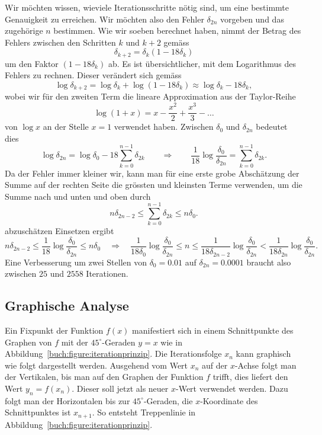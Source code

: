 \begin{beispiel}
Wir möchten wissen, wieviele Iterationsschritte nötig sind, um eine
bestimmte Genauigkeit zu erreichen.
Wir möchten also den Fehler $\delta_{2n}$ vorgeben und das zugehörige
$n$ bestimmen.
Wie wir soeben berechnet haben, nimmt der Betrag des Fehlers zwischen
den Schritten $k$ und $k+2$ gemäss
\[
\delta_{k+2} = \delta_{k} (1-18\delta_k)
\]
um den Faktor $(1-18\delta_k)$ ab.
Es ist übersichtlicher, mit dem Logarithmus des Fehlers zu rechnen.
Dieser verändert sich gemäss
\[
\log \delta_{k+2}
=
\log \delta_{k} + \log(1-18\delta_k)
\approx
\log\delta_k - 18\delta_k,
\]
wobei wir für den zweiten Term die lineare Approximation aus der
Taylor-Reihe
\[
\log (1+x) = x - \frac{x^2}2 + \frac{x^3}3 -\dots
\]
von 
$\log x $ an der Stelle $x=1$ verwendet haben.
Zwischen $\delta_0$ und $\delta_{2n}$ bedeutet dies
\[
\log\delta_{2n}
=
\log\delta_0
-18
\sum_{k=0}^{n-1} \delta_{2k}
\qquad\Rightarrow\qquad
\frac1{18}
\log\frac{\delta_0}{\delta_{2n}}
=
\sum_{k=0}^{n-1}\delta_{2k}.
\]
Da der Fehler immer kleiner wir, kann man für eine erste grobe Abschätzung
der Summe auf der rechten Seite die grössten und kleinsten Terme
verwenden, um die Summe nach und unten und oben durch
\[
n\delta_{2n-2}
\le
\sum_{k=0}^{n-1}\delta_{2k}
\le
n\delta_0.
\]
abzuschätzen
Einsetzen ergibt
\[
n\delta_{2n-2}
\le
\frac{1}{18}
\log\frac{\delta_{0}}{\delta_{2n}}
\le
n\delta_0
\quad\Rightarrow\quad
\frac{1}{18\delta_0}
\log\frac{\delta_{0}}{\delta_{2n}}
\le
n
\le
\frac{1}{18\delta_{2n-2}}
\log\frac{\delta_{0}}{\delta_{2n}}
<
\frac{1}{18\delta_{2n}}
\log\frac{\delta_{0}}{\delta_{2n}}.
\]
Eine Verbesserung um zwei Stellen von $\delta_0=0.01$ auf $\delta_{2n}=0.0001$
braucht also zwischen $25$ und $2558$ Iterationen.
\end{beispiel}

%
%
\subsection{Graphische Analyse
\label{buch:section:graphischeanalyse}}
Ein Fixpunkt der Funktion $f(x)$ manifestiert sich in einem 
Schnittpunkte des Graphen von $f$ mit der $45^\circ$-Geraden
$y=x$ wie in Abbildung~\ref{buch:figure:iterationprinzip}.
Die Iterationsfolge $x_n$ kann graphisch wie folgt dargestellt
werden.
Ausgehend vom Wert $x_n$ auf der $x$-Achse folgt man der Vertikalen,
bis man auf den Graphen der Funktion $f$ trifft, dies liefert den
Wert $y_n=f(x_n)$.
Dieser soll jetzt als neuer $x$-Wert verwendet werden.
Dazu folgt man der Horizontalen bis zur $45^\circ$-Geraden,
die $x$-Koordinate des Schnittpunktes ist $x_{n+1}$.
So entsteht Treppenlinie in Abbildung~\ref{buch:figure:iterationprinzip}.

